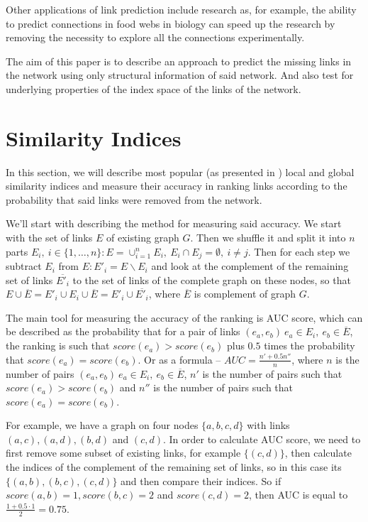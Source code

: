 \documentclass{llncs}
\begin{document}
Other applications of link prediction include research as, for example, the ability to predict connections in food webs in biology can speed up the research by removing the necessity to explore all the connections experimentally.

The aim of this paper is to describe an approach to predict the missing links in the network using only structural information of said network. And also test for underlying properties of the index space of the links of the network.
%
\section{Similarity Indices}
%
In this section, we will describe most popular (as presented in \cite{survey}) local and global similarity indices and measure their accuracy in ranking links according to the probability that said links were removed from the network.

We'll start with describing the method for measuring said accuracy. We start with the set of links $E$ of existing graph $G$. Then we shuffle it and split it into $n$ parts $E_i, \ i \in \{1, \ldots, n\} : E = \cup_{i = 1}^{n} E_i, \ E_i \cap E_j = \emptyset, \ i \neq j$. Then for each step we subtract $E_i$ from $E : E'_i = E \backslash E_i$ and look at the complement of the remaining set of links $\overline{E'_i}$ to the set of links of the complete graph on these nodes, so that $E \cup \overline{E} = E'_i \cup E_i \cup \overline{E} = E'_i \cup \overline{E'_i}$, where $\overline{E}$ is complement of graph $G$.

The main tool for measuring the accuracy of the ranking is AUC \cite{auc} score, which can be described as the probability that for a pair of links $(e_a, e_b) \ e_a \in E_i, \ e_b \in \overline{E}$, the ranking is such that $score(e_a) > score(e_b)$ plus $0.5$ times the probability that $score(e_a) = score(e_b)$. Or as a formula -- $AUC = \frac{n' + 0.5 n''}{n}$, where $n$ is the number of pairs $(e_a, e_b) \ e_a \in E_i, \ e_b \in \overline{E}$, $n'$ is the number of pairs such that $score(e_a) > score(e_b)$ and $n''$ is the number of pairs such that $score(e_a) = score(e_b)$.

For example, we have a graph on four nodes $\{a, b, c, d\}$ with links $(a, c), (a, d), (b, d)$ and $(c, d)$. In order to calculate AUC score, we need to first remove some subset of existing links, for example $\{(c, d)\}$, then calculate the indices of the complement of the remaining set of links, so in this case its $\{(a, b), (b, c), (c, d)\}$ and then compare their indices. So if $score(a, b) = 1, score(b, c) = 2$ and $score(c, d) = 2$, then AUC is equal to $\frac{1 + 0.5 \cdot 1}{2} = 0.75$.
\end{document}
